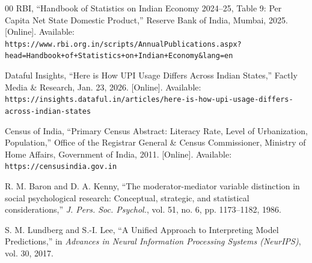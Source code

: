 \documentclass[conference]{IEEEtran}
\begin{document}
\begin{thebibliography}{00}
RBI, ``Handbook of Statistics on Indian Economy 2024--25, Table 9: Per Capita Net State Domestic Product,'' Reserve Bank of India, Mumbai, 2025. [Online]. Available: \nolinkurl{https://www.rbi.org.in/scripts/AnnualPublications.aspx?head=Handbook+of+Statistics+on+Indian+Economy&lang=en}

Dataful Insights, ``Here is How UPI Usage Differs Across Indian States,'' Factly Media \& Research, Jan. 23, 2026. [Online]. Available: \nolinkurl{https://insights.dataful.in/articles/here-is-how-upi-usage-differs-across-indian-states}

Census of India, ``Primary Census Abstract: Literacy Rate, Level of Urbanization, Population,'' Office of the Registrar General \& Census Commissioner, Ministry of Home Affairs, Government of India, 2011. [Online]. Available: \nolinkurl{https://censusindia.gov.in}

R. M. Baron and D. A. Kenny, ``The moderator-mediator variable distinction in social psychological research: Conceptual, strategic, and statistical considerations,'' \textit{J. Pers. Soc. Psychol.}, vol. 51, no. 6, pp. 1173--1182, 1986.

S. M. Lundberg and S.-I. Lee, ``A Unified Approach to Interpreting Model Predictions,'' in \textit{Advances in Neural Information Processing Systems (NeurIPS)}, vol. 30, 2017.

\end{thebibliography}
\end{document}
